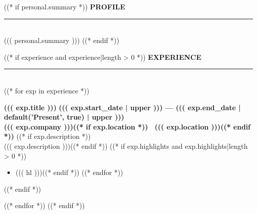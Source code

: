 \documentclass[11pt,a4paper]{article}
\begin{document}
\noindent
\begin{minipage}[t]{0.60\textwidth}
\color{body}
\vspace{7mm}
\hspace{12mm}
\begin{minipage}[t]{0.85\textwidth}

((* if personal.summary *))
{\fontsize{11}{13}\selectfont\bfseries\color{banner}\MakeUppercase{Profile}}\\[2pt]
{\color{divider}\rule{\linewidth}{1.5pt}}\\[8pt]
{\fontsize{9}{12}\selectfont ((( personal.summary )))}
\vspace{16pt}
((* endif *))

((* if experience and experience|length > 0 *))
{\fontsize{11}{13}\selectfont\bfseries\color{banner}\MakeUppercase{Experience}}\\[2pt]
{\color{divider}\rule{\linewidth}{1.5pt}}\\[10pt]
((* for exp in experience *))
\begin{minipage}{\linewidth}
{\fontsize{10}{12}\selectfont\bfseries ((( exp.title )))} \hfill {\scriptsize\color{muted}\bfseries ((( exp.start_date | upper ))) --- ((( exp.end_date | default('Present', true) | upper )))}\\[2pt]
{\fontsize{9}{11}\selectfont\color{accent}\bfseries ((( exp.company )))((* if exp.location *)) \textbar\ ((( exp.location )))((* endif *))}
((* if exp.description *))\\[4pt] {\fontsize{8.5}{11.5}\selectfont ((( exp.description )))}((* endif *))
((* if exp.highlights and exp.highlights|length > 0 *))
\begin{itemize}[leftmargin=12pt, itemsep=2pt, parsep=0pt, topsep=4pt]
((* for hl in exp.highlights *))((* if hl *))\item {\fontsize{8.5}{11.5}\selectfont ((( hl )))}((* endif *))
((* endfor *))
\end{itemize}
((* endif *))
\end{minipage}
\vspace{12pt}
((* endfor *))
((* endif *))


\end{minipage}
\end{minipage}
\end{document}
